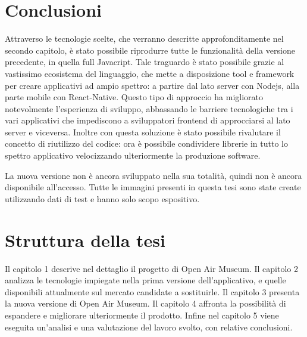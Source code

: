 \section*{Conclusioni}\vspace{5mm}

Attraverso le tecnologie scelte, che verranno descritte approfonditamente nel secondo capitolo, è stato possibile riprodurre tutte le funzionalità della versione precedente, in quella full Javacript. Tale traguardo è stato possibile grazie al vastissimo ecosistema del linguaggio, che mette a disposizione tool e framework per creare applicativi ad ampio spettro: a partire dal lato server con Nodejs, alla parte mobile con React-Native. Questo tipo di approccio ha migliorato notevolmente l'esperienza di sviluppo, abbassando le barriere tecnologiche tra i vari applicativi che impediscono a sviluppatori frontend di approcciarsi al lato server e viceversa. Inoltre con questa soluzione è stato possibile rivalutare il concetto di riutilizzo del codice: ora è possibile condividere librerie in tutto lo spettro applicativo velocizzando ulteriormente la produzione software.\vspace{5mm}

La nuova versione non è ancora sviluppato nella sua totalità, quindi non è ancora disponibile all'accesso. Tutte le immagini presenti in questa tesi sono state create utilizzando dati di test e hanno solo scopo espositivo.
	
\section*{Struttura della tesi}\vspace{5mm}
	
Il capitolo 1 descrive nel dettaglio il progetto di Open Air Museum. Il capitolo 2 analizza le tecnologie impiegate nella prima versione dell'applicativo, e quelle disponibili attualmente sul mercato candidate a sostituirle. Il capitolo 3 presenta la nuova versione di Open Air Museum. Il capitolo 4 affronta la possibilità di espandere e migliorare ulteriormente il prodotto. Infine nel capitolo 5 viene eseguita un’analisi e una valutazione del lavoro svolto, con relative conclusioni. 


